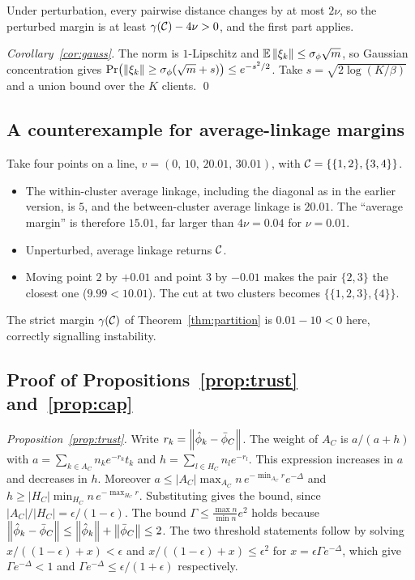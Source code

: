 Under perturbation, every pairwise distance changes by at most $2\nu$, so the perturbed
margin is at least $\gamma(\mathcal{C})-4\nu>0$, and the first part applies.

\emph{Corollary~\ref{cor:gauss}.} The norm is $1$-Lipschitz and
$\mathbb{E}\left\lVert \xi_k \right\rVert\le\sigma_\phi\sqrt m$, so Gaussian concentration
\citep{boucheron2013concentration} gives
$\Pr\bigl(\left\lVert \xi_k \right\rVert\ge\sigma_\phi(\sqrt m+s)\bigr)\le e^{-s^2/2}$. Take
$s=\sqrt{2\log(K/\beta)}$ and a union bound over the $K$ clients.
\qed

\subsection{A counterexample for average-linkage margins}
\label{app:counterexample}
Take four points on a line, $v=(0,\,10,\,20.01,\,30.01)$, with $\mathcal{C}=\{\{1,2\},\{3,4\}\}$.
\begin{itemize}[leftmargin=1.2em,itemsep=1pt]
  \item The within-cluster average linkage, including the diagonal as in the earlier
    version, is $5$, and the between-cluster average linkage is $20.01$. The ``average
    margin'' is therefore $15.01$, far larger than $4\nu=0.04$ for $\nu=0.01$.
  \item Unperturbed, average linkage returns $\mathcal{C}$.
  \item Moving point $2$ by $+0.01$ and point $3$ by $-0.01$ makes the pair $\{2,3\}$ the
    closest one ($9.99<10.01$). The cut at two clusters becomes $\{\{1,2,3\},\{4\}\}$.
\end{itemize}
The strict margin $\gamma(\mathcal{C})$ of Theorem~\ref{thm:partition} is $0.01-10<0$ here,
correctly signalling instability.

\subsection{Proof of Propositions~\ref{prop:trust} and~\ref{prop:cap}}
\emph{Proposition~\ref{prop:trust}.} Write $r_k=\left\lVert \hat\phi_k-\bar\phi_C \right\rVert$. The weight of
$A_C$ is $a/(a+h)$ with $a=\sum_{k\in A_C}n_ke^{-r_k}t_k$ and $h=\sum_{l\in H_C}n_le^{-r_l}$.
This expression increases in $a$ and decreases in $h$. Moreover
$a\le|A_C|\max_{A_C}n\,e^{-\min_{A_C}r}e^{-\Delta}$ and
$h\ge|H_C|\min_{H_C}n\,e^{-\max_{H_C}r}$. Substituting gives the bound, since
$|A_C|/|H_C|=\epsilon/(1-\epsilon)$. The bound $\Gamma\le\frac{\max n}{\min n}e^2$ holds
because $\left\lVert \hat\phi_k-\bar\phi_C \right\rVert\le\left\lVert \hat\phi_k \right\rVert+\left\lVert \bar\phi_C \right\rVert\le2$. The two
threshold statements follow by solving $x/((1-\epsilon)+x)<\epsilon$ and
$x/((1-\epsilon)+x)\le\epsilon^2$ for $x=\epsilon\Gamma e^{-\Delta}$, which give
$\Gamma e^{-\Delta}<1$ and $\Gamma e^{-\Delta}\le\epsilon/(1+\epsilon)$ respectively.

